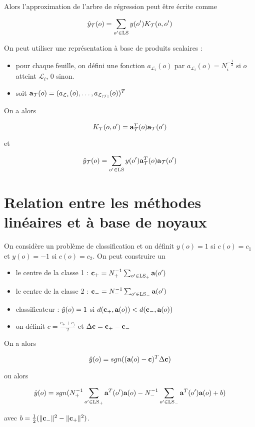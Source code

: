 	Alors l'approximation de l'arbre de régression peut être écrite comme
	
	$$\hat{y}_{\mathcal{T}}(o) = \sum_{o' \in \text{LS}}y(o') K_{\mathcal{T}}(o, o')$$
	
	
	On peut utiliser une représentation à base de produits scalaires :
	
	\begin{itemize}
		\item pour chaque feuille, on défini une fonction $a_{\mathcal{L}_i}(o)$ par $a_{\mathcal{L}_i}(o) = N_i^{- \frac{1}{2}}$ si $o$ atteint $\mathcal{L}_i$, 0 sinon.
		\item soit $\textbf{a}_{\mathcal{T}}(o) = (a_{\mathcal{L}_1}(o), \dots , a_{\mathcal{L}_{\vert \mathcal{T} \vert }}(o))^T$
	\end{itemize}
	
	On a alors
	
	$$K_{\mathcal{T}}(o, o') = \textbf{a}_{\mathcal{T}}^T(o) \textbf{a}_{\mathcal{T}}(o')$$
	
	et
	
	$$\hat{y}_{\mathcal{T}}(o) = \sum_{o' \in \text{LS}} y(o') \textbf{a}_{\mathcal{T}}^T(o) \textbf{a}_{\mathcal{T}}(o')$$
	
	\section{Relation entre les méthodes linéaires et à base de noyaux}
	
	On considère un problème de classification et on définit $y(o) = 1$ si $c(o) = c_1$ et $y(o) = -1$ si $c(o) = c_2$. On peut construire un
	
	\begin{itemize}
		\item le centre de la classe 1 : $\textbf{c}_+ = N_+^{-1} \sum_{o' \in \text{LS}_+} \textbf{a}(o')$
		\item le centre de la classe 2 : $\textbf{c}_- = N_-^{-1} \sum_{o' \in \text{LS}_-} \textbf{a}(o')$
		\item classificateur : $\hat{y}(o) = 1$ si $d(\textbf{c}_+, \textbf{a}(o)) < d(\textbf{c}_-, \textbf{a}(o))$
		\item on définit $c = \frac{c_+ + c_)}{2}$ et $\Delta \textbf{c} = \textbf{c}_+ - \textbf{c}_-$
	\end{itemize}
	
	On a alors
	
	$$\hat{y}(o) = sgn((\textbf{a}(o) - \textbf{c})^T \Delta \textbf{c})$$
	
	ou alors
	
	$$\hat{y}(o) = sgn(N_+^{-1} \sum_{o' \in \text{LS}_+} \textbf{a}^T(o')\textbf{a}(o) - N_-^{-1} \sum_{o' \in \text{LS}_-}\textbf{a}^T(o') \textbf{a}(o) + b)$$
	
	avec $b = \frac{1}{2} (\Vert \textbf{c}_- \Vert^2 - \Vert \textbf{c}_+ \Vert^2)$.
	